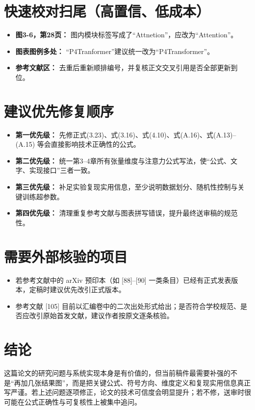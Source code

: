 \documentclass[12pt]{ctexart}
\begin{document}
\section*{快速校对扫尾（高置信、低成本）}
\begin{itemize}
  \item \textbf{图3-6，第28页：} 图内模块标签写成了“Attnetion”，应改为“Attention”。
  \item \textbf{图表图例多处：} “P4Tranformer”建议统一改为“P4Transformer”。
  \item \textbf{参考文献区：} 去重后重新顺排编号，并复核正文交叉引用是否全部更新到位。
\end{itemize}

\section*{建议优先修复顺序}
\begin{itemize}
  \item \textbf{第一优先级：} 先修正式(3.23)、式(3.16)、式(4.10)、式(A.16)、式(A.13)--(A.15) 等会直接影响技术正确性的公式。
  \item \textbf{第二优先级：} 统一第3--4章所有张量维度与注意力公式写法，使“公式、文字、实现接口”三者一致。
  \item \textbf{第三优先级：} 补足实验复现实用信息，至少说明数据划分、随机性控制与关键训练超参数。
  \item \textbf{第四优先级：} 清理重复参考文献与图表拼写错误，提升最终送审稿的规范性。
\end{itemize}

\section*{需要外部核验的项目}
\begin{itemize}
  \item 若参考文献中的 arXiv 预印本（如 [88]--[90] 一类条目）已经有正式发表版本，定稿时建议优先改引正式版本。
  \item 参考文献 [105] 目前以汇编卷中的二次出处形式给出；是否符合学校规范、是否应改引原始首发文献，建议作者按原文逐条核验。
\end{itemize}

\section*{结论}
这篇论文的研究问题与系统实现本身是有价值的，但当前稿件最需要补强的不是“再加几张结果图”，而是把关键公式、符号方向、维度定义和复现实用信息真正写严谨。若上述问题逐项修正，论文的技术可信度会明显提升；若不修，送审时很可能在公式正确性与可复核性上被集中追问。
\end{document}
